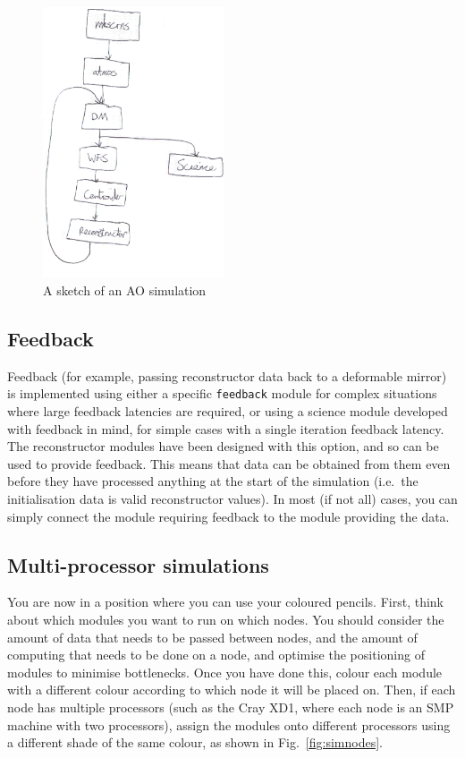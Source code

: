 \documentclass{article}
\newcommand{\mod}[1]{\texttt{#1}}
\begin{document}
\begin{figure}
\includegraphics[height=8cm]{pics/aosimsketchtrans.eps}
\caption{A sketch of an AO simulation}
\label{fig:simsketch}
\end{figure}

\subsection{Feedback}
Feedback (for example, passing reconstructor data back to a deformable
mirror) is implemented using either a specific \mod{feedback} module
for complex situations where large feedback latencies are required, or
using a science module developed with feedback in mind, for simple
cases with a single iteration feedback latency.  The reconstructor
modules have been designed with this option, and so can be used to
provide feedback.  This means that data can be obtained from them even
before they have processed anything at the start of the simulation
(i.e.\ the initialisation data is valid reconstructor values).  In
most (if not all) cases, you can simply connect the module requiring
feedback to the module providing the data.

\subsection{Multi-processor simulations}
You are now in a position where you can use your coloured pencils.
First, think about which modules you want to run on which nodes.  You
should consider the amount of data that needs to be passed between
nodes, and the amount of computing that needs to be done on a node,
and optimise the positioning of modules to minimise bottlenecks.  Once
you have done this, colour each module with a different colour
according to which node it will be placed on.  Then, if each node has
multiple processors (such as the Cray XD1, where each node is an SMP
machine with two processors), assign the modules onto different
processors using a different shade of the same colour, as shown in
Fig.~\ref{fig:simnodes}.  
\end{document}
